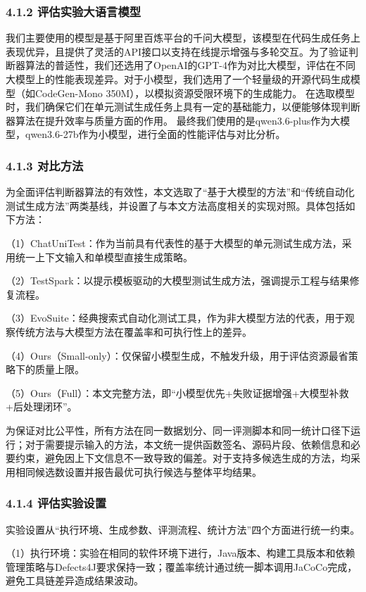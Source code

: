 \subsubsection{4.1.2 评估实验大语言模型}
我们主要使用的模型是基于阿里百炼平台的千问大模型，该模型在代码生成任务上表现优异，且提供了灵活的API接口以支持在线提示增强与多轮交互。为了验证判断器算法的普适性，我们还选用了OpenAI的GPT-4作为对比大模型，评估在不同大模型上的性能表现差异。对于小模型，我们选用了一个轻量级的开源代码生成模型（如CodeGen-Mono 350M），以模拟资源受限环境下的生成能力。
在选取模型时，我们确保它们在单元测试生成任务上具有一定的基础能力，以便能够体现判断器算法在提升效率与质量方面的作用。
最终我们使用的是qwen3.6-plus作为大模型，qwen3.6-27b作为小模型，进行全面的性能评估与对比分析。

\subsubsection{4.1.3 对比方法}

为全面评估判断器算法的有效性，本文选取了“基于大模型的方法”和“传统自动化测试生成方法”两类基线，并设置了与本文方法高度相关的实现对照。具体包括如下方法：

（1）ChatUniTest：作为当前具有代表性的基于大模型的单元测试生成方法，采用统一上下文输入和单模型直接生成策略。

（2）TestSpark：以提示模板驱动的大模型测试生成方法，强调提示工程与结果修复流程。

（3）EvoSuite：经典搜索式自动化测试工具，作为非大模型方法的代表，用于观察传统方法与大模型方法在覆盖率和可执行性上的差异。

（4）Ours（Small-only）：仅保留小模型生成，不触发升级，用于评估资源最省策略下的质量上限。

（5）Ours（Full）：本文完整方法，即“小模型优先+失败证据增强+大模型补救+后处理闭环”。

为保证对比公平性，所有方法在同一数据划分、同一评测脚本和同一统计口径下运行；对于需要提示输入的方法，本文统一提供函数签名、源码片段、依赖信息和必要约束，避免因上下文信息不一致导致的偏差。对于支持多候选生成的方法，均采用相同候选数设置并报告最优可执行候选与整体平均结果。

\subsubsection{4.1.4 评估实验设置}

实验设置从“执行环境、生成参数、评测流程、统计方法”四个方面进行统一约束。

（1）执行环境：实验在相同的软件环境下进行，Java版本、构建工具版本和依赖管理策略与Defects4J要求保持一致；覆盖率统计通过统一脚本调用JaCoCo完成，避免工具链差异造成结果波动。

